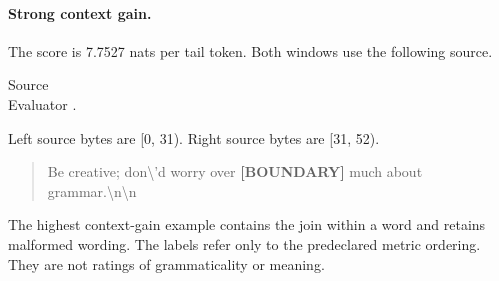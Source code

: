 \noindent\begin{minipage}{\linewidth}

\paragraph{Strong context gain.}

The score is 7.7527 nats per tail token. Both windows use the following source.

\begin{flushleft}\small Source \\ Evaluator .\end{flushleft}

Left source bytes are [0, 31). Right source bytes are [31, 52).

\begin{quote}\small  Be creative; don\textbackslash{}'d worry over\textbf{ [BOUNDARY] }much about grammar.\textbackslash{}n\textbackslash{}n\end{quote}

\end{minipage}\par\medskip

The highest context-gain example contains the join within a word  and retains malformed wording. The labels refer only to the predeclared metric ordering. They are not ratings of grammaticality or meaning.
